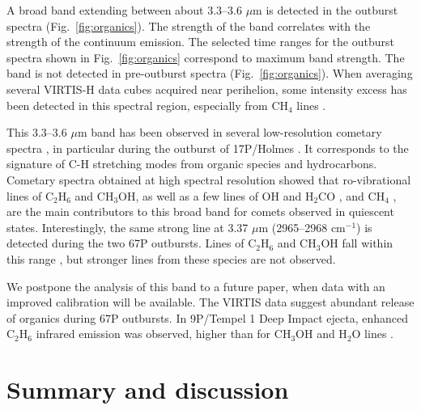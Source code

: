 \documentclass[a4paper,fleqn,usenatbib]{mnras}
\begin{document}
A broad band extending between about 3.3--3.6 $\mu$m is detected in the outburst spectra (Fig.~\ref{fig:organics}). The strength of the band correlates with the strength of the continuum emission. The selected time ranges for the outburst spectra shown in Fig.~\ref{fig:organics} correspond to maximum band strength. The band is not detected in pre-outburst spectra (Fig.~\ref{fig:organics}). When averaging several VIRTIS-H data cubes acquired near perihelion, some intensity excess has been detected in this spectral region, especially from CH$_4$ lines \citep{dbm2016}.

This 3.3--3.6 $\mu$m band has been observed in several low-resolution cometary spectra \citep[][and references therein]{dbm1995}, in particular during the outburst of 17P/Holmes \citep{Yang2009}. It corresponds to the signature of C-H stretching modes from organic species and hydrocarbons. Cometary spectra obtained at high spectral resolution showed that ro-vibrational lines of C$_2$H$_6$ and CH$_3$OH, as well as a few lines of OH and H$_2$CO  \citep[e.g.][]{Dello2006}, and CH$_4$ \citep[e.g.,][]{Mumma1996}, are the main contributors to this broad band for comets observed in quiescent states.
Interestingly, the same strong line at 3.37 $\mu$m (2965--2968 cm$^{-1}$) is detected during the two 67P outbursts. Lines of C$_2$H$_6$ and CH$_3$OH fall within this range \citep{Dello2006}, but stronger lines from these species are not observed.

We postpone the analysis of this band to a future paper, when data with an improved calibration will be available. The VIRTIS data suggest abundant release of organics during 67P outbursts. In 9P/Tempel 1 Deep Impact ejecta, enhanced C$_2$H$_6$ infrared emission was observed, higher than for CH$_3$OH and H$_2$O lines  \citep{Mumma2005,DiSanti2007}.



\section{Summary and discussion}
\label{sec:discussion}
\end{document}
